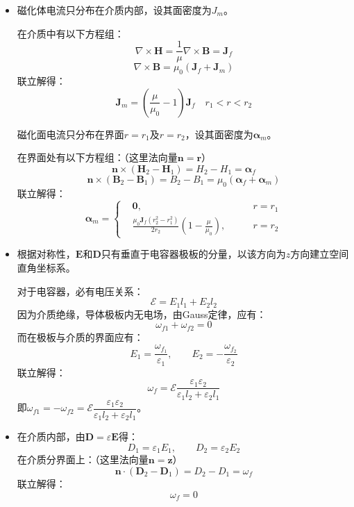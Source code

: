\documentclass[a4paper,fontset=none]{ctexart}
\begin{document}
\begin{itemize}
        \item[8.(2)]
        \textparagraph 磁化体电流只分布在介质内部，设其面密度为$J_m$。

        在介质中有以下方程组：
        \[
            \nabla\times\bm{H} = \frac{1}{\mu}\nabla\times\bm{B} = \bm{J}_f
        \]
        \[
            \nabla\times\bm{B} = \mu_0(\bm{J}_f + \bm{J}_m)
        \]
        联立解得：
        \[
            \bm{J}_m = \left(\frac{\mu}{\mu_0} - 1\right)\bm{J}_f \quad r_1 < r < r_2
        \]

        \textparagraph 磁化面电流只分布在界面$r = r_1$及$r = r_2$，设其面密度为$\bm{\alpha}_m$。

        在界面处有以下方程组：（这里法向量$\bm{n} = \bm{r}$）
        \[
            \bm{n}\times(\bm{H}_2 - \bm{H}_1) = H_2 - H_1 = \bm{\alpha}_f
        \]
        \[
            \bm{n}\times(\bm{B}_2 - \bm{B}_1) = B_2 - B_1 = \mu_0\left(\bm{\alpha}_f + \bm{\alpha}_m\right)
        \]
        联立解得：
        \[
            \bm{\alpha}_m = \left\{
            \begin{aligned}
                & \bm{0},\qquad& r = r_1 \\
                & \frac{\mu_0 \bm{J}_f(r_2^2 - r_1^2)}{2r_2}\left(1 - \frac{\mu}{\mu_0}\right),\qquad& r = r_2
            \end{aligned}
        \right.
        \]

        \item[11.(1)]
        根据对称性，$\bm{E}$和$\bm{D}$只有垂直于电容器极板的分量，以该方向为$\hat{z}$方向建立空间直角坐标系。

        对于电容器，必有电压关系：
        \[
            \mathscr{E} = E_1 l_1 + E_2 l_2
        \]
        因为介质绝缘，导体极板内无电场，由Gauss定律，应有：
        \[
            \omega_{f1} + \omega_{f2} = 0
        \]
        而在极板与介质的界面应有：
        \[
            E_1 = \frac{\omega_{f_1}}{\varepsilon_1},\qquad E_2 = -\frac{\omega_{f_2}}{\varepsilon_2}
        \]
        联立解得：
        \[
            \omega_f = \mathscr{E}\frac{\varepsilon_1 \varepsilon_2}{\varepsilon_1 l_2 + \varepsilon_2 l_1}
        \]
        即$\omega_{f1} = -\omega_{f2} = \mathscr{E}\dfrac{\varepsilon_1 \varepsilon_2}{\varepsilon_1 l_2 + \varepsilon_2 l_1}$。

        \item[11.(2)]
        \textparagraph 在介质内部，由$\bm{D} = \varepsilon\bm{E}$得：
        \[
            D_1 = \varepsilon_1 E_1,\qquad D_2 = \varepsilon_2 E_2
        \]
        在介质分界面上：（这里法向量$\bm{n} = \bm{z}$）
        \[
            \bm{n}\cdot(\bm{D}_2 - \bm{D}_1) = D_2 - D_1 = \omega_f
        \]
        联立解得：
        \[
            \omega_f = 0
        \]


\end{itemize}
\end{document}
